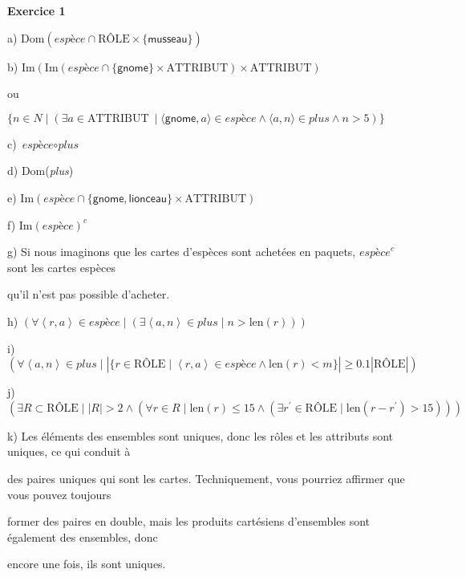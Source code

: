 \documentclass{article}
\newcommand{\role}{\mbox{RÔLE}}
\newcommand{\attribut}{\mbox{ATTRIBUT}}
\newcommand{\compose}{\circ}
\newcommand{\tuple}[1]{\ensuremath{\left\langle #1 \right\rangle}}
\begin{document}
\textbf{Exercice 1}

a) $\text{Dom}(\textit{espèce} \cap \role \times \{ \textsf{musseau} \} )$

\vspace{0.5cm}

b) $ \text{Im}( \text{Im}( \textit{espèce} \cap \{ \textsf{gnome} \} \times \attribut ) \times \attribut ) $ 

ou

$\{ n \in N \mid (\exists a \in \attribut\ \mid \langle \textsf{gnome},a  \rangle \in \textit{espèce} \land \langle a,n \rangle \in \textit{plus} \land n > 5 )\}$

\vspace{0.5cm}

c) $\textit{espèce} \compose \textit{plus}$

\vspace{0.5cm}

d) Dom(\textit{plus})

\vspace{0.5cm}

e) $ \text{Im}(\textit{espèce} \cap \{ \textsf{gnome}, \textsf{lionceau} \} \times \attribut)$

\vspace{0.5cm}

f) $ \text{Im}(\textit{espèce})^{c} $

\vspace{0.5cm}

g) Si nous imaginons que les cartes d'espèces sont achetées en paquets, $\textit{espèce}^{c}$ sont les cartes espèces 

qu'il n'est pas possible d'acheter.

\vspace{0.5cm}

h) $( \forall \tuple{r,a} \in \textit{espèce} \mid ( \exists \tuple{a,n} \in \textit{plus} \mid n > \text{len}(r) ))$

\vspace{0.5cm}

i) $ (  \forall \tuple{a,n} \in \textit{plus} \mid |\{ r \in \role \mid \tuple{r,a} \in \textit{espèce} \land \text{len}(r) < m \}| \geq 0.1 | \role | ) $

\vspace{0.5cm}

j) $( \exists R \subset \role \mid |R| > 2 \land ( \forall r \in R \mid \text{len}(r) \leq 15 \land ( \exists r^{\prime} \in \role \mid \text{len}(r - r^{\prime}) > 15 ) ) ) $

\vspace{0.5cm}

k) Les éléments des ensembles sont uniques, donc les rôles et les attributs sont uniques, ce qui conduit à

des paires uniques qui sont les cartes. Techniquement, vous pourriez affirmer que vous pouvez toujours 

former des paires en double, mais les produits cartésiens d'ensembles sont également des ensembles, donc 

encore une fois, ils sont uniques.
\end{document}
